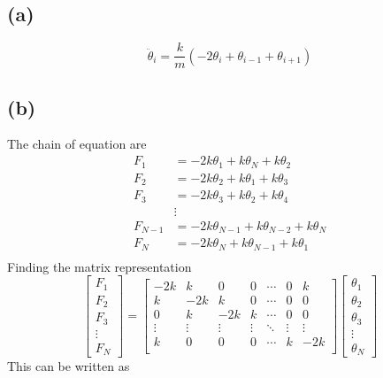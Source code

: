\documentclass[letter, 10pts]{article}
\begin{document}
\subsection*{(a)} 
\[
	\ddot{\theta}_i = \frac{k}{m} \left(- 2 \theta_i + \theta_{i-1} + \theta_{i+1}\right)
\]


\subsection*{(b)} 
The chain of equation are 
\begin{align*}
	F_1 &= - 2 k \theta_1 + k \theta_N + k \theta_2 \\ 
F_2 &=  - 2 k \theta_2 + k \theta_1 + k \theta_3 \\
F_3 &= - 2 k \theta_3 + k \theta_2 + k \theta_4  \\
    & \vdots \\  
F_{N-1} &= - 2 k \theta_{N-1} + k \theta_{N-2} + k \theta_{N} \\
F_N &= - 2 k \theta_N + k \theta_{N-1} + k \theta_1 \\
\end{align*}
Finding the matrix representation 
\[
\begin{bmatrix} F_1 \\ F_2 \\ F_3 \\ \vdots \\ F_N \end{bmatrix}  = 
\begin{bmatrix}
	-2k & k & 0 & 0 & \cdots & 0 & k \\ 
	k & -2k & k & 0 & \cdots & 0 & 0 \\ 
	0 & k & -2k & k & \cdots & 0 & 0 \\ 
	\vdots & 
	\vdots & 
	\vdots & 
	\vdots & 
	\ddots & 
	\vdots & 
	\vdots \\ 
	k& 0 & 0 & 0 & \cdots & k & -2k \\ 
\end{bmatrix} 
\begin{bmatrix} \theta_1 \\ \theta_2 \\ \theta_3 \\ \vdots \\ \theta_N \end{bmatrix} 
\] 
This can be written as 
\end{document}

